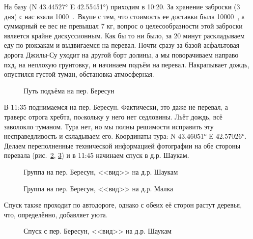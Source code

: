 На базу (N 43.44527° E 42.55451°) приходим в 10:20. За хранение заброски (3 дня) с нас взяли 1000~\faRub.~Вкупе с тем, что стоимость ее доставки была 10000~\faRub, а суммарный ее вес не превышал 7 кг, вопрос о целесообразности этой заброски является крайне дискуссионным. Как бы то ни было, за 20 минут раскладываем еду по рюкзакам и выдвигаемся на перевал. Почти сразу за базой асфальтовая дорога Джилы-Су уходит на другой борт долины, а мы поворачиваем направо пхд, на неплохую грунтовку, и начинаем подъём на перевал. Накрапывает дождь, опустился густой туман, обстановка атмосферная.


\begin{figure}[h!]
	\centering
	\caption{Путь подъёма на пер. Бересун}
	\label{fig:beresun1}
\end{figure}


В 11:35 поднимаемся на пер. Бересун. Фактически, это даже не перевал, а траверс отрога хребта, поcкольку у него нет седловины. Льёт дождь, всё заволокло туманом. Тура нет, но мы полны решимости исправить эту несправедливость и складываем его. Координаты тура: N 43.46051° E 42.57026°. Делаем переполненные технической информацией фотографии на обе стороны перевала (рис.~\ref{fig:beresun2}, \ref{fig:beresun3}) и в 11:45 начинаем спуск в д.р. Шаукам.


\begin{figure}[h!]
	\centering
	\caption{Группа на пер. Бересун, <<вид>> на д.р. Шаукам}
	\label{fig:beresun2}
\end{figure}

\begin{figure}[h!]
	\centering
	\caption{Группа на пер. Бересун, <<вид>> на д.р. Малка}
	\label{fig:beresun3}
\end{figure}

Спуск также проходит по автодороге, однако с обеих её сторон растут деревья, что, определённо, добавляет уюта. 

\begin{figure}[h!]
	\centering
	\caption{Спуск с пер. Бересун, <<вид>> на д.р. Шаукам}
	\label{fig:shaukam}
\end{figure}

